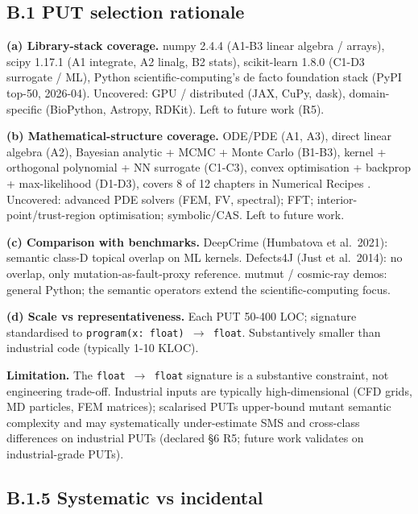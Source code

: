 \documentclass[manuscript,screen,review]{acmart}
\begin{document}
\subsection{B.1 PUT selection rationale}\label{b.1-put-selection-rationale-detailed-coverage-argument}

\textbf{(a) Library-stack coverage.} numpy 2.4.4 (A1-B3 linear algebra /
arrays), scipy 1.17.1 (A1 integrate, A2 linalg, B2 stats), scikit-learn
1.8.0 (C1-D3 surrogate / ML), Python scientific-computing's de facto
foundation stack (PyPI top-50, 2026-04). Uncovered: GPU / distributed
(JAX, CuPy, dask), domain-specific (BioPython, Astropy, RDKit). Left to
future work (R5).

\textbf{(b) Mathematical-structure coverage.} ODE/PDE (A1, A3), direct
linear algebra (A2), Bayesian analytic + MCMC + Monte Carlo (B1-B3),
kernel + orthogonal polynomial + NN surrogate (C1-C3), convex
optimisation + backprop + max-likelihood (D1-D3), covers 8 of 12
chapters in Numerical Recipes \citep{press2007numerical}. Uncovered: advanced
PDE solvers (FEM, FV, spectral); FFT; interior-point/trust-region
optimisation; symbolic/CAS. Left to future work.

\textbf{(c) Comparison with benchmarks.} DeepCrime (Humbatova et
al.~2021): semantic class-D topical overlap on ML kernels. Defects4J (Just et
al.~2014): no overlap, only mutation-as-fault-proxy reference. mutmut /
cosmic-ray demos: general Python; the semantic operators extend the scientific-computing focus.

\textbf{(d) Scale vs representativeness.} Each PUT 50-400 LOC; signature
standardised to \texttt{program(x:\ float)\ $\to$\ float}. Substantively
smaller than industrial code (typically 1-10 KLOC).

\textbf{Limitation.} The \texttt{float\ $\to$\ float} signature is a
substantive constraint, not engineering trade-off. Industrial inputs are
typically high-dimensional (CFD grids, MD particles, FEM matrices);
scalarised PUTs upper-bound mutant semantic complexity and may
systematically under-estimate SMS and cross-class differences on
industrial PUTs (declared §6 R5; future work validates on industrial-grade PUTs).

\subsection{B.1.5 Systematic vs incidental}\label{b.1.5-systematic-vs-incidental}
\end{document}
